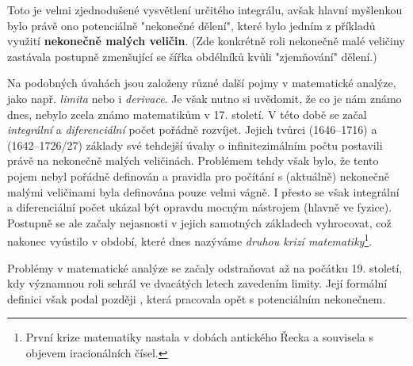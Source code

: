 Toto je velmi zjednodušené vysvětlení určitého integrálu, avšak hlavní myšlenkou bylo právě ono potenciálně "nekonečné dělení", které bylo jedním z příkladů využití \textbf{nekonečně malých veličin}. (Zde konkrétně roli nekonečně malé veličiny zastávala postupně zmenšující se šířka obdélníků kvůli "zjemňování" dělení.)\par
Na podobných úvahách jsou založeny různé další pojmy v matematické analýze, jako např. \emph{limita} nebo i \emph{derivace}. Je však nutno si uvědomit, že co je nám známo dnes, nebylo zcela známo matematikům v 17. století. V této době se začal \emph{integrální} a \emph{diferenciální} počet pořádně rozvíjet. Jejich tvůrci  (1646--1716) a  (1642--1726/27) základy své tehdejší úvahy o infinitezimálním počtu postavili právě na nekonečně malých veličinách. Problémem tehdy však bylo, že tento pojem nebyl pořádně definován a pravidla pro počítání s (aktuálně) nekonečně malými veličinami byla definována pouze velmi vágně. I přesto se však integrální a diferenciální počet ukázal být opravdu mocným nástrojem (hlavně ve fyzice). Postupně se ale začaly nejasnosti v jejich samotných základech vyhrocovat, což nakonec vyústilo v období, které dnes nazýváme \emph{druhou krizí matematiky}\footnote{První krize matematiky nastala v dobách antického Řecka a souvisela s objevem iracionálních čísel.}.\par
Problémy v matematické analýze se začaly odstraňovat až na počátku 19. století, kdy významnou roli sehrál ve dvacátých letech  zavedením limity. Její formální definici však podal později , která pracovala opět s potenciálním nekonečnem. \cite{Fuchs2003}%